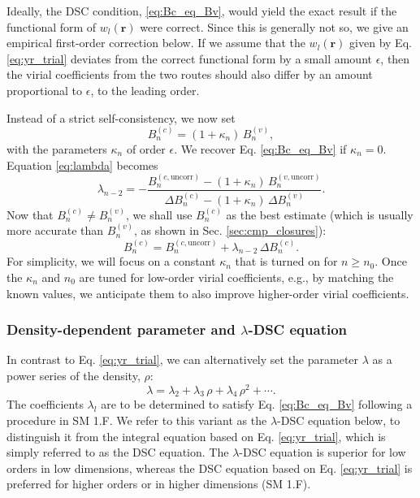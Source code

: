 \documentclass[aip,jcp,preprint,superscriptaddress,showpacs,preprintnumbers,amsmath,amssymb]{revtex4-1}
\newcommand{\vct}[1]{\mathbf{#1}}
\providecommand{\vr}{} %
\renewcommand{\vr}{\vct{r}}
\begin{document}
Ideally, the DSC condition, \eqref{eq:Bc_eq_Bv},
would yield the exact result if the functional form
of $w_l(\vr)$ were correct.
%
Since this is generally not so,
we give an empirical first-order correction below.
%
If we assume that
the $w_l(\vr)$ given by Eq. \eqref{eq:yr_trial}
deviates from the correct functional form
by a small amount $\epsilon$,
then the virial coefficients
from the two routes should also differ
by an amount proportional to $\epsilon$,
to the leading order.



Instead of a strict self-consistency, we now set
\begin{equation}
B_n^{(c)}
=
(1 + \kappa_n) \, B_n^{(v)},
\label{eq:Bc_eq_Bv_kappa1}
\end{equation}
with the parameters $\kappa_n$ of order $\epsilon$.
%
We recover Eq. \eqref{eq:Bc_eq_Bv}
if $\kappa_n = 0$.
%
Equation \eqref{eq:lambda} becomes
\begin{equation}
\lambda_{n - 2}
=
-
\frac{ B_n^{(c, \mathrm{uncorr})}
 - (1 + \kappa_n) \, B_n^{(v, \mathrm{uncorr})} }
{ \Delta B_n^{(c)}
  - (1 + \kappa_n) \, \Delta B_n^{(v)} }.
\end{equation}
%
Now that $B_n^{(c)} \ne B_n^{(v)}$,
we shall use $B_n^{(c)}$
as the best estimate
(which is usually more accurate than $B_n^{(v)}$,
as shown in Sec. \ref{sec:cmp_closures}):
%
\begin{equation}
B_n^{(c)}
=
B_n^{(c, \mathrm{uncorr})}
+
\lambda_{n - 2} \, \Delta B_n^{(c)}.
\end{equation}
%
For simplicity,
we will focus on a constant $\kappa_n$
that is turned on for $n \ge n_0$.
%
Once the $\kappa_n$
and $n_0$ are tuned for low-order virial coefficients,
e.g., by matching the known values,
we anticipate them to also improve
higher-order virial coefficients.





\subsubsection{
Density-dependent parameter and $\lambda$-DSC equation
}




In contrast to Eq. \eqref{eq:yr_trial},
we can alternatively set the parameter $\lambda$
as a power series of the density, $\rho$\cite{
rowlinson1965, gaskell1968, hutchinson1971, hall1980}:
\begin{equation}
\lambda
=
\lambda_2
+ \lambda_3 \, \rho
+ \lambda_4 \, \rho^2 + \cdots.
\label{eq:DSC_lambda}
\end{equation}
%
The coefficients $\lambda_l$
are to be determined to satisfy Eq. \eqref{eq:Bc_eq_Bv}
following a procedure in SM 1.F.
%
We refer to this variant as the $\lambda$-DSC equation below,
to distinguish it from the integral equation
based on Eq. \eqref{eq:yr_trial},
which is simply referred to as the DSC equation.
%
The $\lambda$-DSC equation is superior for low orders
in low dimensions,
whereas the DSC equation based on Eq. \eqref{eq:yr_trial}
is preferred for higher orders or in higher dimensions (SM 1.F).
\end{document}

